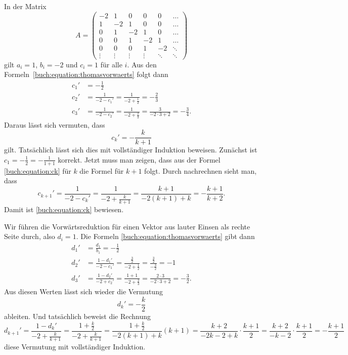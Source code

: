 \begin{beispiel}
In der Matrix
\begin{equation}
A=\begin{pmatrix}
    -2&     1&     0&     0&     0&\dots \\
     1&    -2&     1&     0&     0&\dots \\
     0&     1&    -2&     1&     0&\dots \\
     0&     0&     1&    -2&     1&\dots \\
     0&     0&     0&     1&    -2&\ddots\\
\vdots&\vdots&\vdots&\vdots&\ddots&\ddots
\end{pmatrix}
\label{buch:equation:Atridiagonal}
\end{equation}
gilt $a_i=1$, $b_i=-2$ und $c_i=1$ für alle $i$.
Aus den Formeln~\eqref{buch:equation:thomasvorwaerts}
folgt dann
\begin{align*}
c_1'&=-\frac12
\\
c_2'&=\frac{1}{-2-c_1'}=\frac{1}{-2+\frac12}=-\frac{2}{3}
\\
c_3'&=\frac{1}{-2-c_2'}=\frac{1}{-2+\frac{2}{3}}=\frac{3}{-2\cdot 3 + 2}
=-\frac{3}{4}.
\end{align*}
Daraus lässt sich vermuten, dass
\begin{equation}
c_k'=-\frac{k}{k+1}
\label{buch:equation:ck}
\end{equation}
gilt.
Tatsächlich lässt sich dies mit vollständiger Induktion beweisen.
Zunächst ist $c_1=-\frac12=-\frac1{1+1}$ korrekt.
Jetzt muss man zeigen, dass aus der Formel \eqref{buch:equation:ck} für $k$
die Formel für $k+1$ folgt.
Durch nachrechnen sieht man, dass
\[
c_{k+1}'
=
\frac1{-2-c_{k}'}
=
\frac{1}{-2+\displaystyle\frac{k}{k+1}}
=
\frac{k+1}{-2(k+1)+k}
=
-\frac{k+1}{k+2}.
\]
Damit ist \eqref{buch:equation:ck} bewiesen.

Wir führen die Vorwärtsreduktion für einen Vektor aus lauter Einsen
als rechte Seite durch, also $d_i=1$.
Die Formeln \eqref{buch:equation:thomasvorwaerts} gibt dann
\begin{align*}
d_1'
&=
\frac{d_1}{b_1} = -\frac12
\\
d_2'
&=
\frac{1-d_1'}{-2-c_1'}
=
\frac{\frac32}{-2+\frac12}
=
\frac{\frac32}{-\frac{3}{2}}
=-1
\\
d_3'
&=
\frac{1-d_2'}{-2+c_2'}
=
\frac{1+1}{-2+\frac23}
=
\frac{2\cdot 3}{-2\cdot 3 + 2}
=
-\frac{3}{2}.
\end{align*}
Aus diesen Werten lässt sich wieder die Vermutung 
\[
d_{k}'=-\frac{k}2
\]
ableiten.
Und tatsächlich beweist die Rechnung
\[
d_{k+1}'
=
\frac{1-d_k'}{-2+\frac{k}{k+1}}
=
\frac{1+\frac{k}{2}}{-2+\frac{k}{k+1}}
=
\frac{1+\frac{k}{2}}{-2(k+1)+k} (k+1)
=
\frac{k+2}{-2k-2+k}
\cdot
\frac{k+1}{2}
=
\frac{k+2}{-k-2}
\cdot
\frac{k+1}{2}
=
-\frac{k+1}{2}
\]
diese Vermutung mit vollständiger Induktion.
\end{beispiel}

